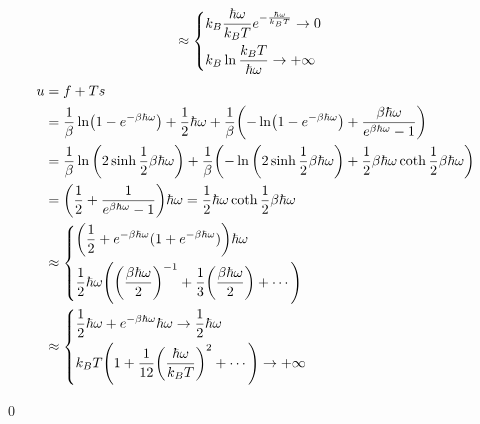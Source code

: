 \documentclass[uplatex,dvipdfmx,a4paper,11pt]{jlreq}
\makeatletter
\theoremstyle{definition}
\renewenvironment{proof}[1][\proofname]{\par
  \normalfont
  \topsep6\p@\@plus6\p@ \trivlist
  \item[\hskip\labelsep{\bfseries #1}\@addpunct{\bfseries}]\ignorespaces\quad\par
}{%
  \qed\endtrivlist\@endpefalse
}
\renewcommand\proofname{証明}
\makeatother
\begin{document}
\begin{proof}
\begin{align}
      & \approx \begin{dcases}
                  k_B\frac{\hbar\omega}{k_BT}e^{- \frac{\hbar\omega}{k_BT}} \to 0 \\
                  k_B\ln\frac{k_BT}{\hbar\omega} \to +\infty                      \\
                \end{dcases}
  \end{align}
  \begin{align}
    u & = f + Ts                                                                                                                                                                                      \\
      & = \frac{1}{\beta}\ln(1 - e^{-\beta\hbar\omega}) + \frac{1}{2}\hbar\omega + \frac{1}{\beta}\qty(-\ln(1 - e^{-\beta\hbar\omega}) + \frac{\beta\hbar\omega}{e^{\beta\hbar\omega} - 1})           \\
      & = \frac{1}{\beta}\ln\qty(2\sinh \frac{1}{2}\beta\hbar\omega) + \frac{1}{\beta}\qty(-\ln\qty(2\sinh\frac{1}{2}\beta\hbar\omega) + \frac{1}{2}\beta\hbar\omega\coth\frac{1}{2}\beta\hbar\omega) \\
      & = \qty(\frac{1}{2} + \frac{1}{e^{\beta\hbar\omega} - 1})\hbar\omega = \frac{1}{2}\hbar\omega\coth\frac{1}{2}\beta\hbar\omega                                                                  \\
      & \approx \begin{dcases}
                  \qty(\frac{1}{2} + e^{-\beta\hbar\omega}(1 + e^{-\beta\hbar\omega}))\hbar\omega                                          \\
                  \frac{1}{2}\hbar\omega\qty(\qty(\frac{\beta\hbar\omega}{2})^{-1} + \frac{1}{3}\qty(\frac{\beta\hbar\omega}{2}) + \cdots) \\
                \end{dcases}                                                              \\
      & \approx \begin{dcases}
                  \frac{1}{2}\hbar\omega + e^{-\beta\hbar\omega}\hbar\omega \to \frac{1}{2}\hbar\omega \\
                  k_BT\qty(1 + \frac{1}{12}\qty(\frac{\hbar\omega}{k_BT})^{2} + \cdots) \to +\infty    \\
                \end{dcases}
  \end{align}
  \begin{align}

\end{align}
\end{proof}
\end{document}

